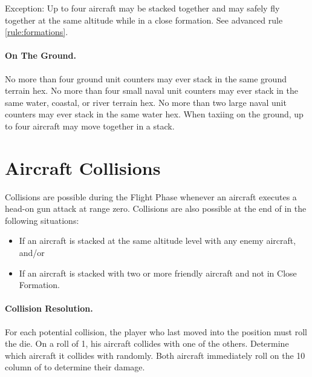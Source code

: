 Exception: Up to four aircraft may be stacked together and may safely fly together at the same altitude while in a close formation. See advanced rule \ref{rule:formations}.

\paragraph{On The Ground.}
No more than four ground unit counters may ever stack in the same ground terrain hex. No more than four small naval unit counters may ever stack in the same water, coastal, or river terrain hex. No more than two large naval unit counters may ever stack in the same water hex. When taxiing on the ground, up to four aircraft may move together in a stack.


\section{Aircraft Collisions}
\label{rule:aircraft-collisions}

Collisions are possible during the Flight Phase whenever an aircraft executes a head-on gun attack at range zero. Collisions are also possible at the end of  in the following situations:

\begin{itemize}
    \item
    If an aircraft is stacked at the same altitude level with any enemy aircraft, and/or
    \item
    If an aircraft is stacked with two or more friendly aircraft and not in Close Formation.
\end{itemize}

\paragraph{Collision Resolution.} 
 For each potential collision, the player who last moved into the position must roll the die. On a roll of 1, his aircraft collides with one of the others. Determine which aircraft it collides with randomly. Both aircraft immediately roll on the 10 column of  to determine their damage.

